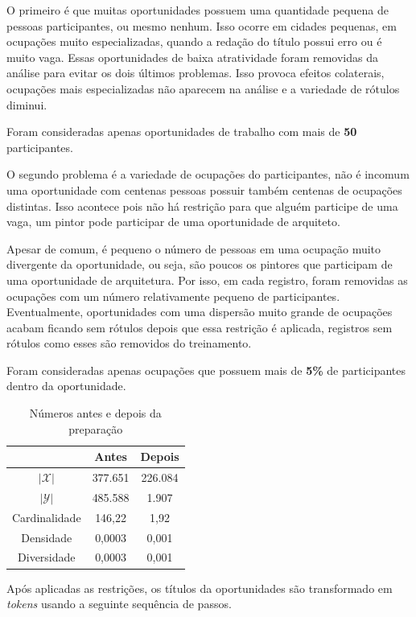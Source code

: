\documentclass[runningheads,a4paper]{llncs}
\begin{document}
O primeiro é que muitas oportunidades possuem uma quantidade pequena de pessoas participantes, ou mesmo nenhum. Isso ocorre em cidades pequenas, em ocupações muito especializadas, quando a redação do título possui erro ou é muito vaga. Essas oportunidades de baixa atratividade foram removidas da análise para evitar os dois últimos problemas. Isso provoca efeitos colaterais, ocupações mais especializadas não aparecem na análise e a variedade de rótulos diminui.

Foram consideradas apenas oportunidades de trabalho com mais de \textbf{50} participantes.

O segundo problema é a variedade de ocupações do participantes, não é incomum uma oportunidade com centenas pessoas possuir também centenas de ocupações distintas. Isso acontece pois não há restrição para que alguém participe de uma vaga, um pintor pode participar de uma oportunidade de arquiteto.

Apesar de comum, é pequeno o número de pessoas em uma ocupação muito divergente da oportunidade, ou seja, são poucos os pintores que participam de uma oportunidade de arquitetura. Por isso, em cada registro, foram removidas as ocupações com um número relativamente pequeno de participantes. Eventualmente, oportunidades com uma dispersão muito grande de ocupações acabam ficando sem rótulos depois que essa restrição é aplicada, registros sem rótulos como esses são removidos do treinamento.

Foram consideradas apenas ocupações que possuem mais de \textbf{5\%} de participantes dentro da oportunidade.

\begin{table}
	\centering
	\begin{tabular}{| c | c | c |}
		\hline
		& \textbf{Antes} & \textbf{Depois} \\
		\hline
		$|\mathcal{X}|$ & 377.651 & 226.084 \\
		\hline
		$|\mathcal{Y}|$ & 485.588 & 1.907 \\
		\hline
		Cardinalidade & 146,22 & 1,92 \\
		\hline
		Densidade & 0,0003 & 0,001 \\
		\hline
		Diversidade & 0,0003 & 0,001 \\
		\hline
	\end{tabular}
	\caption{Números antes e depois da preparação}
	\label{tab:preparacao}
\end{table}

Após aplicadas as restrições, os títulos da oportunidades são transformado em \textit{tokens} usando a seguinte sequência de passos.
\end{document}

